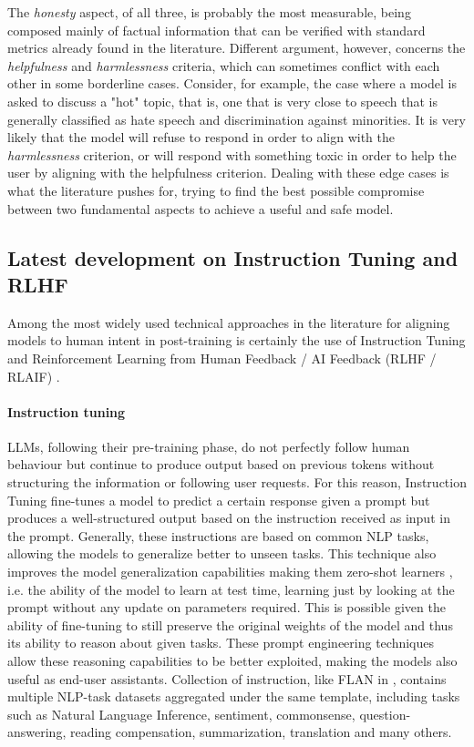 The \textit{honesty} aspect, of all three, is probably the most measurable, being composed mainly of factual information that can be verified with standard metrics already found in the literature.
Different argument, however, concerns the \textit{helpfulness} and \textit{harmlessness} criteria, which can sometimes conflict with each other in some borderline cases. Consider, for example, the case where a model is asked to discuss a "hot" topic, that is, one that is very close to speech that is generally classified as hate speech and discrimination against minorities. It is very likely that the model will refuse to respond in order to align with the \textit{harmlessness} criterion, or will respond with something toxic in order to help the user by aligning with the helpfulness criterion. Dealing with these edge cases is what the literature pushes for, trying to find the best possible compromise between two fundamental aspects to achieve a useful and safe model.



\subsection{Latest development on Instruction Tuning and RLHF}
\label{section:technical-Istruct-RLHF}

Among the most widely used technical approaches in the literature for aligning models to human intent in post-training is certainly the use of Instruction Tuning \citep{NEURIPS2022_b1efde53, min-etal-2022-metaicl, NEURIPS2020_1f89885d} and Reinforcement Learning from Human Feedback / AI Feedback (RLHF / RLAIF) \citep{christiano2023deep, gao2022scaling}.

\paragraph{Instruction tuning} LLMs, following their pre-training phase, do not perfectly follow human behaviour but continue to produce output based on previous tokens without structuring the information or following user requests. For this reason, Instruction Tuning fine-tunes a model to predict a certain response given a prompt but produces a well-structured output based on the instruction received as input in the prompt. Generally, these instructions are based on common NLP tasks, allowing the models to generalize better to unseen tasks. This technique also improves the model generalization capabilities making them zero-shot learners \citep{wei2022finetuned, sanh2022multitask}, i.e. the ability of the model to learn at test time, learning just by looking at the prompt without any update on parameters required. This is possible given the ability of fine-tuning to still preserve the original weights of the model and thus its ability to reason about given tasks. These prompt engineering techniques allow these reasoning capabilities to be better exploited, making the models also useful as end-user assistants. Collection of instruction, like FLAN in \citet{wei2022finetuned}, contains multiple NLP-task datasets aggregated under the same template, including tasks such as Natural Language Inference, sentiment, commonsense, question-answering, reading compensation, summarization, translation and many others.

